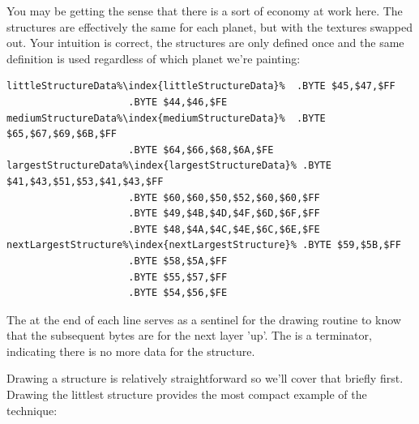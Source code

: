 You may be getting the sense that there is a sort of economy at work here. The structures are effectively
the same for each planet, but with the textures swapped out. Your intuition is correct, the structures
are only defined once and the same definition is used regardless of which planet we're painting:

\begin{lstlisting}[caption=The definitions of three of the structures\index{structures} above\, each of which serves all five planets.,escapechar=\%]
littleStructureData%\index{littleStructureData}%  .BYTE $45,$47,$FF
                     .BYTE $44,$46,$FE
mediumStructureData%\index{mediumStructureData}%  .BYTE $65,$67,$69,$6B,$FF
                     .BYTE $64,$66,$68,$6A,$FE
largestStructureData%\index{largestStructureData}% .BYTE $41,$43,$51,$53,$41,$43,$FF
                     .BYTE $60,$60,$50,$52,$60,$60,$FF
                     .BYTE $49,$4B,$4D,$4F,$6D,$6F,$FF
                     .BYTE $48,$4A,$4C,$4E,$6C,$6E,$FE
nextLargestStructure%\index{nextLargestStructure}% .BYTE $59,$5B,$FF
                     .BYTE $58,$5A,$FF
                     .BYTE $55,$57,$FF
                     .BYTE $54,$56,$FE
\end{lstlisting}

The  at the end of each line serves as a sentinel for the drawing routine to know that the subsequent bytes
are for the next layer 'up'. The  is a terminator, indicating there is no more data for the structure.

Drawing a structure is relatively straightforward so we'll cover that briefly first. Drawing the littlest
structure provides the most compact example of the technique:

